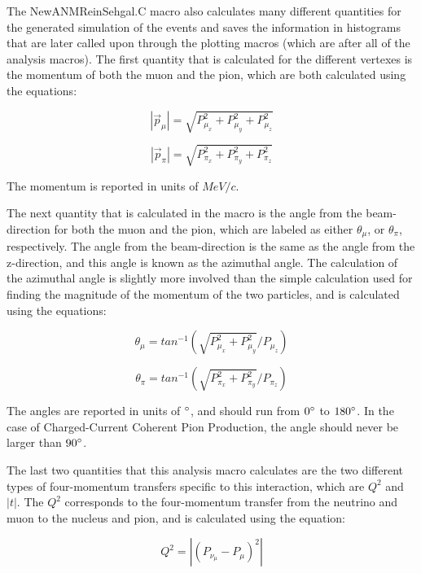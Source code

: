 \documentclass[11pt]{article}
\begin{document}
The NewANMReinSehgal.C macro also calculates many different quantities for the generated simulation of the events and saves the information in histograms that are later called upon through the plotting macros (which are after all of the analysis macros). The first quantity that is calculated for the different vertexes is the momentum of both the muon and the pion, which are both calculated using the equations:

\begin{equation}
|\vec{p}_\mu| = \sqrt{P_{\mu_x}^2 + P_{\mu_y}^2 + P_{\mu_z}^2}
\end{equation}

\begin{equation}
|\vec{p}_\pi| = \sqrt{P_{\pi_x}^2 + P_{\pi_y}^2 + P_{\pi_z}^2}
\end{equation}

\noindent
The momentum is reported in units of $MeV/c$.

The next quantity that is calculated in the macro is the angle from the beam-direction for both the muon and the pion, which are labeled as either $\theta_\mu$, or $\theta_\pi$, respectively. The angle from the beam-direction is the same as the angle from the z-direction, and this angle is known as the azimuthal angle. The calculation of the azimuthal angle is slightly more involved than the simple calculation used for finding the magnitude of the momentum of the two particles, and is calculated using the equations:

\begin{equation}
\theta_\mu = tan^{-1}(\sqrt{P_{\mu_x}^2 + P_{\mu_y}^2}/{P_{\mu_z}})
\end{equation}

\begin{equation}
\theta_\pi = tan^{-1}(\sqrt{P_{\pi_x}^2 + P_{\pi_y}^2}/{P_{\pi_z}})
\end{equation}

\noindent
The angles are reported in units of $\degree$, and should run from $0\degree$ to $180\degree$. In the case of Charged-Current Coherent Pion Production, the angle should never be larger than $90\degree$.

The last two quantities that this analysis macro calculates are the two different types of four-momentum transfers specific to this interaction, which are $Q^2$ and $|t|$. The $Q^2$ corresponds to the four-momentum transfer from the neutrino and muon to the nucleus and pion, and is calculated using the equation:

\begin{equation}
Q^2 = |(P_{\nu_\mu} - P_\mu)^2|
\end{equation}
\end{document}
